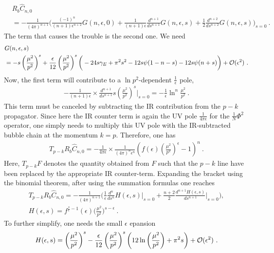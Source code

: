 \documentclass[a4paper,11pt]{article}
\begin{document}
\begin{align} \label{eq:partlyCn0}
& R_{b}\hat C_{n,0}\nonumber \\ 
&=-\frac{1}{(4\pi)^{n+1}}\bigg(\frac{(-1)^n}{(n+1)\epsilon^{n+2}}G(n,\epsilon,0)+\frac{1}{(n+1)\epsilon}\frac{d^{n+1}}{ds^{n+1}}G(n,\epsilon,s)+\frac{1}{2}\frac{d^{n+2}}{ds^{n+2}}G(n,\epsilon,s)\bigg)_{s=0} \ .
\end{align}
The term that causes the trouble is the second one. We need 
\begin{align}
& G(n,\epsilon,s)\nonumber \\ 
&=-s \left(\frac{\mu^2}{p^2}\right)^s+\frac{\epsilon}{12}\left(\frac{\mu^2}{p^2}\right)^s\bigg(-24s\gamma_E+\pi^2s^2-12s\psi(1-n-s)-12s\psi(n+s)\bigg)+{\cal O}(\epsilon^2) \ .
\end{align}
Now, the first term will contribute to a $\ln p^2$-dependent $\frac{1}{\epsilon}$ pole,
\begin{align}
-\frac{1}{(n+1)\epsilon}\times \frac{d^{n+1}}{ds^{n+1}} s \left(\frac{\mu^2}{p^2}\right)^s\bigg|_{s=0}=-\frac{1}{\epsilon}\ln^{n}\frac{\mu^2}{p^2} \ .
\end{align}
This term must be canceled by subtracting the IR contribution from the $p-k$ propagator. Since here the IR counter term is again the UV pole $\frac{1}{4\pi \epsilon}$ for the $\frac{1}{N}\Phi^2$ operator, one simply needs to multiply this UV pole  with the IR-subtracted bubble chain at the momentum $k=p$. Therefore, one has
\begin{align}\label{eq:contertermpminusk}
T_{p-k}R_b \hat C_{n,0}=-\frac{1}{4\pi \epsilon}\times \frac{1}{(4\pi)^{n}\epsilon^n}\left(f(\epsilon)\left(\frac{\mu^2}{p^2}\right)^{\epsilon}-1\right)^n \ .
\end{align}
Here, $T_{p-k}F$ denotes the quantity obtained from $F$ such that the $p-k$ line have been replaced by the appropriate IR counter-term. Expanding the bracket using the binomial theorem, after using the summation formulas one reaches
\begin{align}\label{eq:TRC0}
T_{p-k}R_b \hat C_{n,0}=-\frac{1}{(4\pi)^{n+1}}\bigg(\frac{1}{\epsilon}\frac{d^n}{ds^n}H(\epsilon,s)\bigg|_{s=0}+\frac{n+2}{2}\frac{d^{n+1}H(\epsilon,s)}{ds^{n+1}}\bigg|_{s=0}\bigg), \nonumber \\ 
H(\epsilon,s)=f^{\frac{s}{\epsilon}-1}(\epsilon)\bigg(\frac{\mu^2}{p^2}\bigg)^{s-\epsilon} \ .
\end{align}
To further simplify, one needs the small $\epsilon$ epansion
\begin{align}
H(\epsilon,s)=\left(\frac{\mu^2}{p^2}\right)^s-\frac{\epsilon}{12} \left(\frac{\mu^2}{p^2}\right)^s \left(12 \ln \left(\frac{\mu^2}{p^2}\right)+\pi ^2 s\right)+{\cal O}(\epsilon^2) \ .
\end{align}
\end{document}
